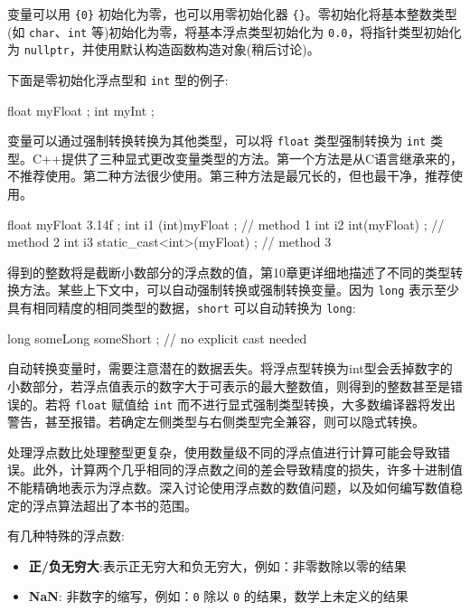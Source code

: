 
变量可以用 \verb|{0}| 初始化为零，也可以用零初始化器 \verb|{}|。零初始化将基本整数类型(如 \verb|char|、\verb|int| 等)初始化为零，将基本浮点类型初始化为 \verb|0.0|，将指针类型初始化为 \verb|nullptr|，并使用默认构造函数构造对象(稍后讨论)。

下面是零初始化浮点型和 \verb|int| 型的例子:

\begin{cpp}
float myFloat {};
int myInt {};
\end{cpp}


变量可以通过强制转换转换为其他类型，可以将 \verb|float| 类型强制转换为 \verb|int| 类型。C++提供了三种显式更改变量类型的方法。第一个方法是从C语言继承来的，不推荐使用。第二种方法很少使用。第三种方法是最冗长的，但也最干净，推荐使用。

\begin{cpp}
float myFloat { 3.14f };
int i1 { (int)myFloat }; // method 1
int i2 { int(myFloat) }; // method 2
int i3 { static_cast<int>(myFloat) }; // method 3
\end{cpp}

得到的整数将是截断小数部分的浮点数的值，第10章更详细地描述了不同的类型转换方法。某些上下文中，可以自动强制转换或强制转换变量。因为 \verb|long| 表示至少具有相同精度的相同类型的数据，\verb|short| 可以自动转换为 \verb|long|:

\begin{cpp}
long someLong { someShort }; // no explicit cast needed
\end{cpp}

自动转换变量时，需要注意潜在的数据丢失。将浮点型转换为int型会丢掉数字的小数部分，若浮点值表示的数字大于可表示的最大整数值，则得到的整数甚至是错误的。若将 \verb|float| 赋值给 \verb|int| 而不进行显式强制类型转换，大多数编译器将发出警告，甚至报错。若确定左侧类型与右侧类型完全兼容，则可以隐式转换。


处理浮点数比处理整型更复杂，使用数量级不同的浮点值进行计算可能会导致错误。此外，计算两个几乎相同的浮点数之间的差会导致精度的损失，许多十进制值不能精确地表示为浮点数。深入讨论使用浮点数的数值问题，以及如何编写数值稳定的浮点算法超出了本书的范围。

有几种特殊的浮点数:

\begin{itemize}
\item
\textbf{正/负无穷大}:表示正无穷大和负无穷大，例如：非零数除以零的结果

\item
\textbf{NaN}: 非数字的缩写，例如：\verb|0| 除以 \verb|0| 的结果，数学上未定义的结果
\end{itemize}

